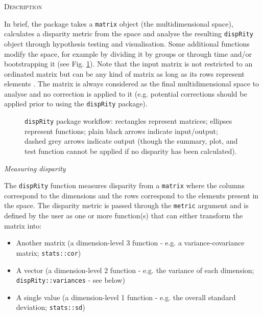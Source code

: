 \documentclass[12pt,letterpaper]{article}
\renewcommand{\section}[1]{%
\bigskip
\begin{center}
\begin{Large}
\normalfont\scshape #1
\medskip
\end{Large}
\end{center}}
\renewcommand{\subsection}[1]{%
\bigskip
\begin{center}
\begin{large}
\normalfont\itshape #1
\end{large}
\end{center}}
\newcommand{\disp}{\texttt{dispRity} }
\begin{document}
\section{Description}
In brief, the package takes a \texttt{matrix} object (the multidimensional space), calculates a disparity metric from the space and analyse the resulting \texttt{dispRity} object through hypothesis testing and visualisation.
Some additional functions modify the space, for example by dividing it by groups or through time and/or bootstrapping it (see Fig. \ref{Fig:workflow}).
Note that the input matrix is not restricted to an ordinated matrix but can be any kind of matrix as long as its rows represent elements \citep[e.g. the space can be a distance matrix][]{Close2015}.
The matrix is always considered as the final multidimensional space to analyse and no correction is applied to it (e.g. potential corrections should be applied prior to using the \texttt{dispRity} package).

\begin{figure}[!htbp]
\centering
\caption{\disp package workflow: rectangles represent matrices; ellipses represent functions; plain black arrows indicate input/output; dashed grey arrows indicate output (though the summary, plot, and test function cannot be applied if no disparity has been calculated).}
\label{Fig:workflow}
\end{figure}

\subsection{Measuring disparity}
The \disp function measures disparity from a \texttt{matrix} where the columns correspond to the dimensions and the rows correspond to the elements present in the space.
The disparity metric is passed through the \texttt{metric} argument and is defined by the user as one or more function(s) that can either transform the matrix into:

\begin{itemize}
    \item Another matrix (a dimension-level 3 function - e.g. a variance-covariance matrix; \texttt{stats::cor})
    \item A vector (a dimension-level 2 function - e.g. the variance of each dimension; \texttt{dispRity::variances} - see below)
    \item A single value (a dimension-level 1 function - e.g. the overall standard deviation; \texttt{stats::sd})
\end{itemize}
\end{document}
